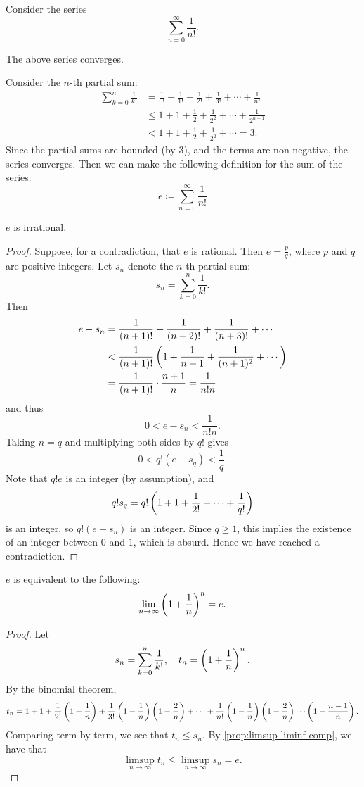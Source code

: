 \begin{example}
Consider the series
\[\sum_{n=0}^{\infty}\frac{1}{n!}.\]
\begin{claim}
The above series converges.
\end{claim}
Consider the $n$-th partial sum:
\begin{align*}
\sum_{k=0}^{n}\frac{1}{k!}
&=\frac{1}{0!}+\frac{1}{1!}+\frac{1}{2!}+\frac{1}{3!}+\cdots+\frac{1}{n!}\\
&\le1+1+\frac{1}{2}+\frac{1}{2^2}+\cdots+\frac{1}{2^{n-1}}\\
&<1+1+\frac{1}{2}+\frac{1}{2^2}+\cdots=3.
\end{align*}
Since the partial sums are bounded (by $3$), and the terms are non-negative, the series converges. Then we can make the following definition for the sum of the series:
\[e\coloneqq\sum_{n=0}^\infty\frac{1}{n!}\]

\begin{proposition*}
$e$ is irrational.
\end{proposition*}

\begin{proof}
Suppose, for a contradiction, that $e$ is rational. Then $e=\frac{p}{q}$, where $p$ and $q$ are positive integers. Let $s_n$ denote the $n$-th partial sum:
\[s_n=\sum_{k=0}^{n}\frac{1}{k!}.\]
Then
\begin{align*}
e-s_n
&=\frac{1}{(n+1)!}+\frac{1}{(n+2)!}+\frac{1}{(n+3)!}+\cdots\\
&<\frac{1}{(n+1)!}\left(1+\frac{1}{n+1}+\frac{1}{(n+1)^2}+\cdots\right)\\
&=\frac{1}{(n+1)!}\cdot\frac{n+1}{n}=\frac{1}{n!n}
\end{align*}
and thus
\[0<e-s_n<\frac{1}{n!n}.\]
Taking $n=q$ and multiplying both sides by $q!$ gives
\[0<q!(e-s_q)<\frac{1}{q}.\]
Note that $q!e$ is an integer (by assumption), and
\[q!s_q=q!\left(1+1+\frac{1}{2!}+\cdots+\frac{1}{q!}\right)\]
is an integer, so $q!(e-s_n)$ is an integer. Since $q\ge1$, this implies the existence of an integer between $0$ and $1$, which is absurd. Hence we have reached a contradiction.
\end{proof}

\begin{lemma*}
$e$ is equivalent to the following:
\[\lim_{n\to\infty}\left(1+\frac{1}{n}\right)^n=e.\]
\end{lemma*}

\begin{proof}
Let
\[s_n=\sum_{k=0}^n\frac{1}{k!},\quad t_n=\left(1+\frac{1}{n}\right)^n.\]
By the binomial theorem,
\[t_n=1+1+\frac{1}{2!}\left(1-\frac{1}{n}\right)+\frac{1}{3!}\left(1-\frac{1}{n}\right)\left(1-\frac{2}{n}\right)+\cdots+\frac{1}{n!}\left(1-\frac{1}{n}\right)\left(1-\frac{2}{n}\right)\cdots\left(1-\frac{n-1}{n}\right).\]
Comparing term by term, we see that $t_n\le s_n$. By \cref{prop:limsup-liminf-comp}, we have that
\[\limsup_{n\to\infty}t_n\le\limsup_{n\to\infty}s_n=e.\]


\end{proof}
\end{example}
